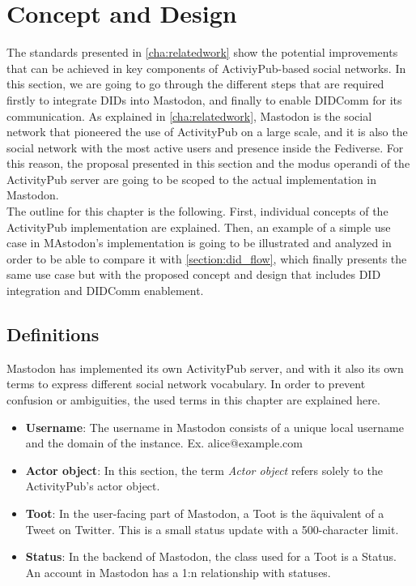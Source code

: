 \chapter{Concept and Design}
\label{cha:conceptanddesign}
 
The standards presented in \autoref{cha:relatedwork} show the potential improvements that can be achieved in key components of ActiviyPub-based social networks. In this section, we are going to go through the different steps that are required firstly to integrate DIDs into Mastodon, and finally to enable DIDComm for its communication. As explained in \autoref{cha:relatedwork}, Mastodon is the social network that pioneered the use of ActivityPub on a large scale, and it is also the social network with the most active users and presence inside the Fediverse. For this reason, the proposal presented in this section and the modus operandi of the ActivityPub server are going to be scoped to the actual implementation in Mastodon.\\
The outline for this chapter is the following. First, individual concepts of the ActivityPub implementation are explained. Then, an example of a simple use case in MAstodon's implementation is going to be illustrated and analyzed in order to be able to compare it with \autoref{section:did_flow}, which finally presents the same use case but with the proposed concept and design that includes DID integration and DIDComm enablement.
 
\section{Definitions}
Mastodon has implemented its own ActivityPub server, and with it also its own terms to express different social network vocabulary. In order to prevent confusion or ambiguities, the used terms in this chapter are explained here. 
 
\begin{itemize}
  \item \textbf{Username}: The username in Mastodon consists of a unique local username and the domain of the instance. Ex. alice@example.com
  \item \textbf{Actor object}: In this section, the term \emph{Actor object} refers solely to the ActivityPub's actor object. 
  \item \textbf{Toot}: In the user-facing part of Mastodon, a Toot is the äquivalent of a Tweet on Twitter. This is a small status update with a 500-character limit.
  \item \textbf{Status}: In the backend of Mastodon, the class used for a Toot is a Status. An account in Mastodon has a 1:n relationship with statuses.
\end{itemize}

